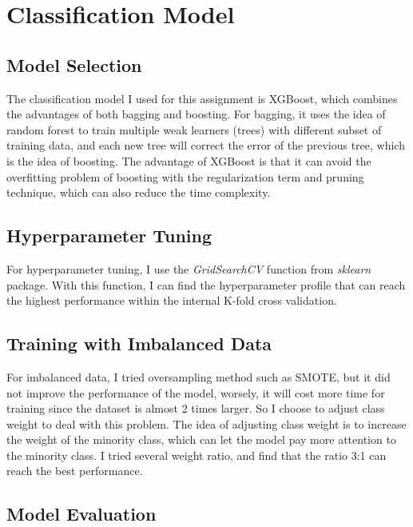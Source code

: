 \documentclass[a4paper, oneside, final, 12pt]{scrartcl} %
\begin{document}
\clearpage

\section{Classification Model}

\subsection{Model Selection}

The classification model I used for this assignment is XGBoost\cite{chen2016xgboost},
which combines the advantages of both bagging and boosting.
For bagging, it uses the idea of random forest to train 
multiple weak learners (trees) with different subset of training data,
and each new tree will correct the error of the previous tree, 
which is the idea of boosting.
The advantage of XGBoost is that it can avoid the overfitting problem of boosting
with the regularization term and pruning technique, which can also reduce the time complexity.

\subsection{Hyperparameter Tuning}

For hyperparameter tuning, I use the \emph{GridSearchCV} function from \emph{sklearn} package.
With this function, I can find the hyperparameter profile that can reach the highest performance
within the internal K-fold cross validation.

\subsection{Training with Imbalanced Data}

For imbalanced data, I tried oversampling method such as SMOTE,
but it did not improve the performance of the model,
worsely, it will cost more time for training since the dataset is almost 2 times larger.
So I choose to adjust class weight to deal with this problem.
The idea of adjusting class weight is to increase the weight of the minority class,
which can let the model pay more attention to the minority class.
I tried several weight ratio, and find that the ratio 3:1 can reach the best performance.

\subsection{Model Evaluation}
\end{document}
